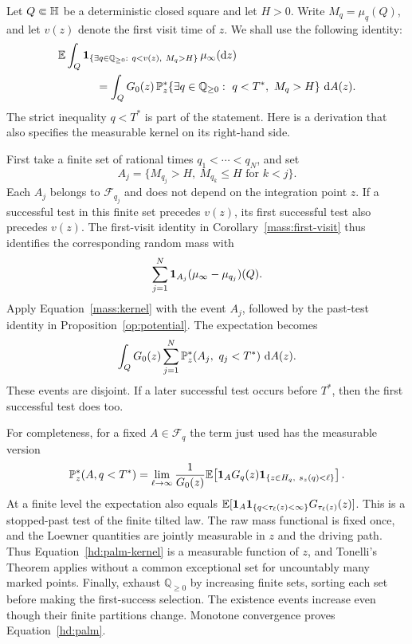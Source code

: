 Let \(Q\Subset\mathbb H\) be a deterministic closed square and let
\(H>0\). Write \(M_q=\mu_q(Q)\), and let \(v(z)\) denote the first
visit time of \(z\). We shall use the following identity:
\begin{align}
 &\EE\int_Q
   \ind_{\{\exists q\in\mathbb Q_{\ge0}:
                 \ q<v(z),\ M_q>H\}}\,\mu_\infty(\dd z)
 \notag\\
 &\hspace{12mm}=
 \int_Q G_0(z)\,
   \PP_z^*\{\exists q\in\mathbb Q_{\ge0}:
                 \ q<T^*,\ M_q>H\}\,\dd A(z).
 \label{hd:palm}
\end{align}
The strict inequality \(q<T^*\) is part of the statement.
Here is a derivation that also specifies the measurable kernel
on its right-hand side.

First take a finite set of rational times
\(q_1<\cdots<q_N\), and set
\[
 A_j=\{M_{q_j}>H,\ M_{q_k}\le H\text{ for }k<j\}.
\]
Each \(A_j\) belongs to \(\mathcal F_{q_j}\) and does not depend on
the integration point \(z\). If a successful test in this finite
set precedes \(v(z)\), its first successful test also precedes
\(v(z)\). The first-visit identity in
Corollary~\ref{mass:first-visit} thus
identifies the corresponding random mass with
\[
 \sum_{j=1}^N
    \mathbf 1_{A_j}(\mu_\infty-\mu_{q_j})(Q).
\]
Apply Equation~\eqref{mass:kernel} with the event \(A_j\), followed
by the past-test identity in Proposition~\ref{op:potential}.
The expectation becomes
\[
 \int_Q G_0(z)
       \sum_{j=1}^N\mathbb P_z^*(A_j,\ q_j<T^*)\,\mathop{}\!\mathrm{d} A(z).
\]
These events are disjoint. If a later successful test occurs before
\(T^*\), then the first successful test does too.

For completeness, for a fixed \(A\in\mathcal F_q\) the term just
used has the measurable version
\begin{equation}
 \mathbb P_z^*(A,q<T^*)=
 \lim_{\ell\to\infty}
 \frac{1}{G_0(z)}
 \mathbb E\!\left[
   \mathbf 1_A G_q(z)
   \mathbf 1_{\{z\in H_q,\ s_z(q)<\ell\}}
 \right].
 \label{hd:palm-kernel}
\end{equation}
At a finite level the expectation also equals
\(\mathbb E[\mathbf 1_A\mathbf 1_{\{q<\tau_\ell(z)<\infty\}}
G_{\tau_\ell(z)}(z)]\).
This is a stopped-past test of the finite tilted law.
The raw mass functional is fixed once, and the Loewner quantities
are jointly measurable in \(z\) and the driving path.
Thus Equation~\eqref{hd:palm-kernel} is a measurable function of
\(z\), and Tonelli's Theorem applies without a common exceptional
set for uncountably many marked points.
Finally, exhaust \(\mathbb Q_{\ge0}\) by increasing finite sets,
sorting each set before making the first-success selection.
The existence events increase even though their finite partitions
change. Monotone convergence proves Equation~\eqref{hd:palm}.


